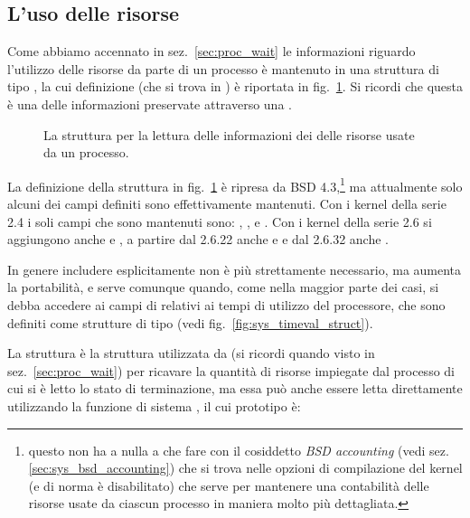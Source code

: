 \subsection{L'uso delle risorse}
\label{sec:sys_resource_use}

Come abbiamo accennato in sez.~\ref{sec:proc_wait} le informazioni riguardo
l'utilizzo delle risorse da parte di un processo è mantenuto in una struttura
di tipo , la cui definizione (che si trova in
) è riportata in
fig.~\ref{fig:sys_rusage_struct}. Si ricordi che questa è una delle
informazioni preservate attraverso una .

\begin{figure}[!htb]
  \footnotesize
  \centering
  \begin{minipage}[c]{0.8\textwidth}
  \end{minipage} 
  \normalsize 
  \caption{La struttura  per la lettura delle informazioni dei 
    delle risorse usate da un processo.}
  \label{fig:sys_rusage_struct}
\end{figure}

La definizione della struttura in fig.~\ref{fig:sys_rusage_struct} è ripresa
da BSD 4.3,\footnote{questo non ha a nulla a che fare con il cosiddetto
  \textit{BSD accounting} (vedi sez. \ref{sec:sys_bsd_accounting}) che si
  trova nelle opzioni di compilazione del kernel (e di norma è disabilitato)
  che serve per mantenere una contabilità delle risorse usate da ciascun
  processo in maniera molto più dettagliata.} ma attualmente solo alcuni dei
campi definiti sono effettivamente mantenuti. Con i kernel della serie 2.4 i
soli campi che sono mantenuti sono: , ,
 e . Con i kernel della serie 2.6 si
aggiungono anche  e , a partire dal 2.6.22
anche  e  e dal 2.6.32 anche
.

In genere includere esplicitamente  non è più strettamente
necessario, ma aumenta la portabilità, e serve comunque quando, come nella
maggior parte dei casi, si debba accedere ai campi di  relativi
ai tempi di utilizzo del processore, che sono definiti come strutture di tipo
 (vedi fig.~\ref{fig:sys_timeval_struct}).

La struttura  è la struttura utilizzata da  (si
ricordi quando visto in sez.~\ref{sec:proc_wait}) per ricavare la quantità di
risorse impiegate dal processo di cui si è letto lo stato di terminazione, ma
essa può anche essere letta direttamente utilizzando la funzione di sistema
, il cui prototipo è:

